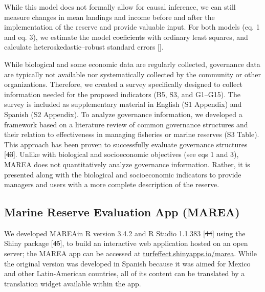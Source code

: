 \documentclass[12pt,]{article}
\providecommand{\DIFaddtex}[1]{{\protect\color{blue}\uwave{#1}}} %
\providecommand{\DIFdeltex}[1]{{\protect\color{red}\sout{#1}}}                      %
\providecommand{\DIFaddbegin}{} %
\providecommand{\DIFaddend}{} %
\providecommand{\DIFdelbegin}{} %
\providecommand{\DIFdelend}{} %
\providecommand{\DIFadd}[1]{\texorpdfstring{\DIFaddtex{#1}}{#1}} %
\providecommand{\DIFdel}[1]{\texorpdfstring{\DIFdeltex{#1}}{}} %
\newcommand{\DIFscaledelfig}{0.5}
\newlength{\DIFdelgraphicswidth} %
\newlength{\DIFdelgraphicsheight} %
\newcommand{\DIFaddincludegraphics}[2][]{{\color{blue}\fbox{\DIFOincludegraphics[#1]{#2}}}} %
\newcommand{\DIFdelincludegraphics}[2][]{%
\sbox{\DIFdelgraphicsbox}{\DIFOincludegraphics[#1]{#2}}%
\settoboxwidth{\DIFdelgraphicswidth}{\DIFdelgraphicsbox} %
\settoboxtotalheight{\DIFdelgraphicsheight}{\DIFdelgraphicsbox} %
\scalebox{\DIFscaledelfig}{%
\parbox[b]{\DIFdelgraphicswidth}{\usebox{\DIFdelgraphicsbox}\\[-\baselineskip] \rule{\DIFdelgraphicswidth}{0em}}\llap{\resizebox{\DIFdelgraphicswidth}{\DIFdelgraphicsheight}{%
\setlength{\unitlength}{\DIFdelgraphicswidth}%
\begin{picture}(1,1)%
\thicklines\linethickness{2pt} %
{\color[rgb]{1,0,0}\put(0,0){\framebox(1,1){}}}%
{\color[rgb]{1,0,0}\put(0,0){\line( 1,1){1}}}%
{\color[rgb]{1,0,0}\put(0,1){\line(1,-1){1}}}%
\end{picture}%
}\hspace*{3pt}}} %
} %
\DeclareRobustCommand{\DIFaddbegin}{\DIFOaddbegin \let\includegraphics\DIFaddincludegraphics} %
\DeclareRobustCommand{\DIFaddend}{\DIFOaddend \let\includegraphics\DIFOincludegraphics} %
\DeclareRobustCommand{\DIFdelbegin}{\DIFOdelbegin \let\includegraphics\DIFdelincludegraphics} %
\DeclareRobustCommand{\DIFdelend}{\DIFOaddend \let\includegraphics\DIFOincludegraphics} %
\begin{document}
While this model does not formally allow for causal inference, we can
still measure changes in mean landings and income before and after the
implementation of the reserve and provide valuable input. For both
models (eq. 1 and eq. 3), we estimate the model \DIFdelbegin \DIFdel{coeficients }\DIFdelend \DIFaddbegin \DIFadd{coefficient }\DIFaddend with
ordinary least squares, and calculate heteroskedastic--robust standard
errors \DIFaddbegin {[}\DIFadd{48}{]}\DIFaddend .

While biological and some economic data are regularly collected,
governance data are typically not available nor systematically collected
by the community or other organizations. Therefore, we created a survey
specifically designed to collect information needed for the proposed
indicators (B5, S3, and G1--G15). The survey is included as
supplementary material in English (S1 Appendix) and Spanish (S2
Appendix). To analyze governance information, we developed a framework
based on a literature review of common governance structures and their
relation to effectiveness in managing fisheries or marine reserves (S3
Table). This approach has been proven to successfully evaluate
governance structures {[}\DIFdelbegin \DIFdel{43}\DIFdelend \DIFaddbegin \DIFadd{49}\DIFaddend {]}. Unlike with biological and socioeconomic
objectives (see eqs 1 and 3), MAREA does not quantitatively analyze
governance information. Rather, it is presented along with the
biological and socioeconomic indicators to provide managers and users
with a more complete description of the reserve.

\subsection{Marine Reserve Evaluation App
(MAREA)}\label{marine-reserve-evaluation-app-marea}

We developed MAREAin R version 3.4.2 and R Studio 1.1.383 {[}\DIFdelbegin \DIFdel{44}\DIFdelend \DIFaddbegin \DIFadd{50}\DIFaddend {]} using
the Shiny package {[}\DIFdelbegin \DIFdel{45}\DIFdelend \DIFaddbegin \DIFadd{51}\DIFaddend {]}, to build an interactive web application
hosted on an open server; the MAREA app can be accessed at
\href{turfeffect.shinyapps.io/marea/}{turfeffect.shinyapps.io/marea}.
While the original version was developed in Spanish because it was aimed
for Mexico and other Latin-American countries, all of its content can be
translated by a translation widget available within the app.
\end{document}
